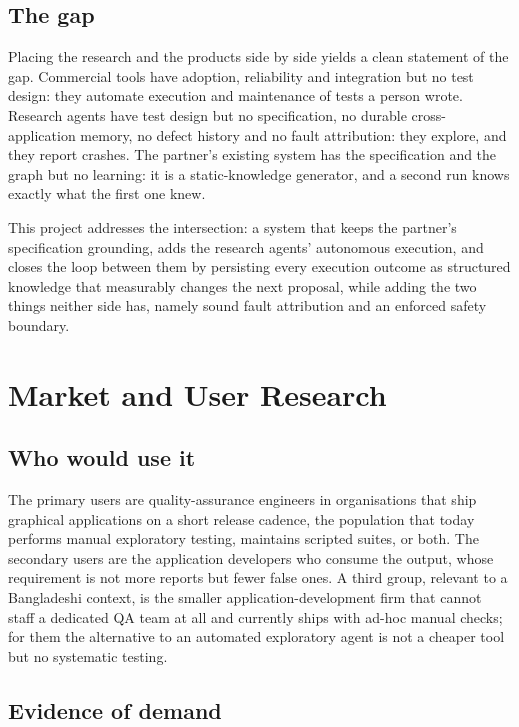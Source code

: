 \subsection*{The gap}

Placing the research and the products side by side yields a clean statement of
the gap. Commercial tools have adoption, reliability and integration but no
test design: they automate execution and maintenance of tests a person wrote.
Research agents have test design but no specification, no durable
cross-application memory, no defect history and no fault attribution: they
explore, and they report crashes. The partner's existing system has the
specification and the graph but no learning: it is a static-knowledge
generator, and a second run knows exactly what the first one knew.

This project addresses the intersection: a system that keeps the partner's
specification grounding, adds the research agents' autonomous execution, and
closes the loop between them by persisting every execution outcome as
structured knowledge that measurably changes the next proposal, while adding
the two things neither side has, namely sound fault attribution and an enforced
safety boundary.

\section{Market and User Research}
\label{sec:market}

\subsection*{Who would use it}

The primary users are quality-assurance engineers in organisations that ship
graphical applications on a short release cadence, the population that today
performs manual exploratory testing, maintains scripted suites, or both. The
secondary users are the application developers who consume the output, whose
requirement is not more reports but fewer false ones. A third group, relevant
to a Bangladeshi context, is the smaller application-development firm that
cannot staff a dedicated QA team at all and currently ships with ad-hoc manual
checks; for them the alternative to an automated exploratory agent is not a
cheaper tool but no systematic testing.

\subsection*{Evidence of demand}

